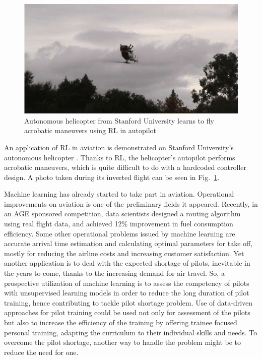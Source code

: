 \begin{figure}
\begin{center}
\includegraphics[width=13.1cm]{figures/invertedHelicopterAndrewNg}
\caption{Autonomous helicopter from Stanford University learns to fly acrobatic maneuvers using RL in autopilot \cite{ng2003shaping}} 
\label{fig:invertedHelicopterAndrewNg}
\end{center}
\end{figure}

An application of RL in aviation is demonstrated on Stanford University's autonomous helicopter \cite{ng2003shaping}. Thanks to RL, the helicopter's autopilot performs acrobatic maneuvers, which is quite difficult to do with a hardcoded controller design. A photo taken during its inverted flight can be seen in Fig.~\ref{fig:invertedHelicopterAndrewNg}.


Machine learning has already started to take part in aviation. Operational improvements on aviation is one of the preliminary fields it appeared. Recently, in an AGE sponsored competition, data scientists designed a routing algorithm using real flight data, and achieved 12\% improvement in fuel consumption efficiency. Some other operational problems issued by machine learning are accurate arrival time estimation and calculating optimal parameters for take off, mostly for reducing the airline costs and increasing customer satisfaction. Yet another application is to deal with the expected shortage of pilots, inevitable in the years to come, thanks to the increasing demand for air travel. So, a prospective utilization of machine learning is to assess the competency of pilots with unsupervised learning models in order to reduce the long duration of pilot training, hence contributing to tackle pilot shortage problem. Use of data-driven approaches for pilot training could be used not only for assessment of the pilots but also to increase the efficiency of the training by offering trainee focused personal training, adapting the curriculum to their individual skills and needs. To overcome the pilot shortage, another way to handle the problem might be to reduce the need for one. 

